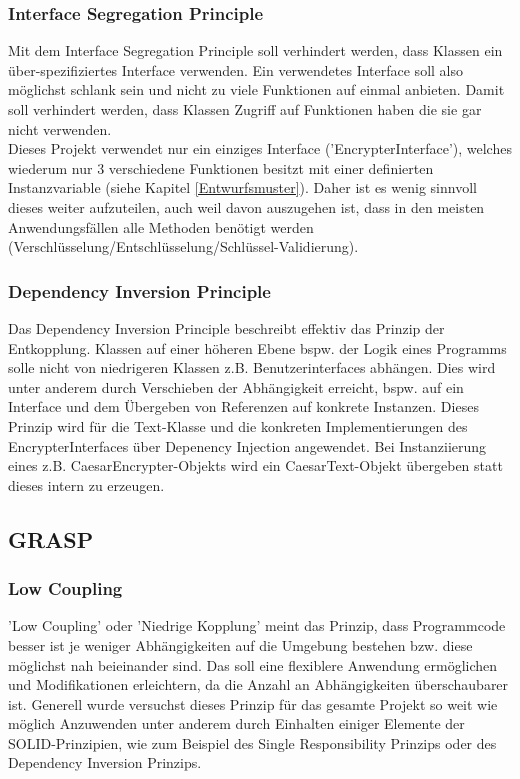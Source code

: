 \documentclass[12pt]{article}
\begin{document}
\subsubsection{Interface Segregation Principle}
Mit dem Interface Segregation Principle soll verhindert werden, dass Klassen ein über-spezifiziertes Interface verwenden. Ein verwendetes Interface soll also möglichst schlank sein und nicht zu viele Funktionen auf einmal anbieten. Damit soll verhindert werden, dass Klassen Zugriff auf Funktionen haben die sie gar nicht verwenden.\\
Dieses Projekt verwendet nur ein einziges Interface ('EncrypterInterface'), welches wiederum nur 3 verschiedene Funktionen besitzt mit einer definierten Instanzvariable (siehe Kapitel \ref{Entwurfsmuster}). Daher ist es wenig sinnvoll dieses weiter aufzuteilen, auch weil davon auszugehen ist, dass in den meisten Anwendungsfällen alle Methoden benötigt werden (Verschlüsselung/Entschlüsselung/Schlüssel-Validierung).

\subsubsection{Dependency Inversion Principle}
Das Dependency Inversion Principle beschreibt effektiv das Prinzip der Entkopplung. Klassen auf einer höheren Ebene bspw. der Logik eines Programms solle nicht von niedrigeren Klassen z.B. Benutzerinterfaces abhängen. Dies wird unter anderem durch Verschieben der Abhängigkeit erreicht, bspw. auf ein Interface und dem Übergeben von Referenzen auf konkrete Instanzen. Dieses Prinzip wird für die Text-Klasse und die konkreten Implementierungen des EncrypterInterfaces über Depenency Injection angewendet. Bei Instanziierung eines z.B. CaesarEncrypter-Objekts wird ein CaesarText-Objekt übergeben statt dieses intern zu erzeugen.

\subsection{GRASP}

\subsubsection{Low Coupling}
'Low Coupling' oder 'Niedrige Kopplung' meint das Prinzip, dass Programmcode besser ist je weniger Abhängigkeiten auf die Umgebung bestehen bzw. diese möglichst nah beieinander sind. Das soll eine flexiblere Anwendung ermöglichen und Modifikationen erleichtern, da die Anzahl an Abhängigkeiten überschaubarer ist. Generell wurde versuchst dieses Prinzip für das gesamte Projekt so weit wie möglich Anzuwenden unter anderem durch Einhalten einiger Elemente der SOLID-Prinzipien, wie zum Beispiel des Single Responsibility Prinzips oder des Dependency Inversion Prinzips.
\end{document}
